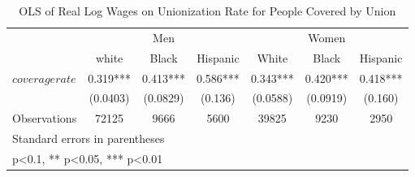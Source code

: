 \begin{table}[htbp]\centering
\def\sym#1{\ifmmode^{#1}\else\(^{#1}\)\fi}
\caption{OLS of Real Log Wages on Unionization Rate for People Covered by Union}
\begin{tabular}{l*{6}{c}}
\hline\hline
                    &\multicolumn{3}{c}{Men}                        &\multicolumn{3}{c}{Women}                      \\\cmidrule(lr){2-4}\cmidrule(lr){5-7}
                    &\multicolumn{1}{c}{white}&\multicolumn{1}{c}{Black}&\multicolumn{1}{c}{Hispanic}&\multicolumn{1}{c}{White}&\multicolumn{1}{c}{Black}&\multicolumn{1}{c}{Hispanic}\\
\hline
$ coveragerate $    &       0.319***&       0.413***&       0.586***&       0.343***&       0.420***&       0.418***\\
                    &    (0.0403)   &    (0.0829)   &     (0.136)   &    (0.0588)   &    (0.0919)   &     (0.160)   \\
\hline
Observations        &       72125   &        9666   &        5600   &       39825   &        9230   &        2950   \\
\hline\hline
\multicolumn{7}{l}{\footnotesize Standard errors in parentheses}\\
\multicolumn{7}{l}{\footnotesize * p<0.1, ** p<0.05, *** p<0.01}\\
\end{tabular}
\end{table}
